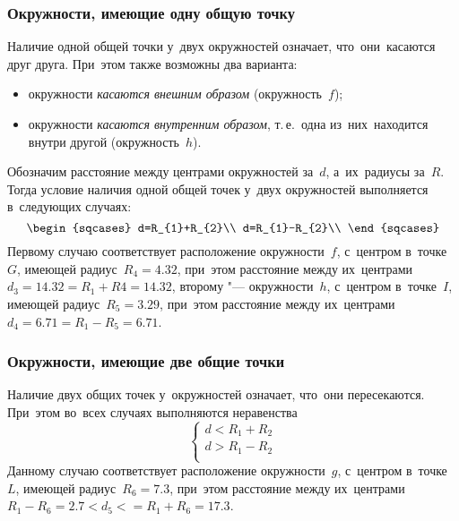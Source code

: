 \documentclass[]{scrartcl}
\begin{document}
\subsubsection{Окружности, имеющие одну общую точку}
Наличие одной общей точки у~двух окружностей означает, что~они~касаются друг друга. При~этом также возможны два варианта:
\begin{itemize}
	\item окружности \emph{касаются внешним образом} (окружность~${\textstyle f}$);
	\item окружности \emph{касаются внутренним образом}, т.\,е.~одна из~них~находится внутри другой (окружность~${\textstyle h}$).
\end{itemize}
Обозначим расстояние между центрами окружностей за~${\textstyle d}$, а~их~радиусы за~${\textstyle R}$. Тогда условие наличия одной общей точек у~двух окружностей выполняется в~следующих случаях:
\begin{equation}\label{eq:two-circles-intersect-one-point}
\begin{sqcases}
d=R_{1}+R_{2}\\
d=R_{1}-R_{2}\\
\end{sqcases}
\end{equation}
Первому случаю соответствует расположение окружности~${\textstyle f}$, с~центром в~точке~${\textstyle G}$, имеющей радиус~${\textstyle R_{4}=4.32}$, при~этом расстояние между их~центрами~${\textstyle d_{3}=14.32=R_{1}+R{4}=14.32}$, второму "--- окружности~${\textstyle h}$, с~центром в~точке~${\textstyle I}$, имеющей радиус~${\textstyle R_{5}=3.29}$, при~этом расстояние между их~центрами~${\textstyle d_{4}=6.71=R_{1}-R_{5}=6.71}$.
\subsubsection{Окружности, имеющие две общие точки}
Наличие двух общих точек у~окружностей означает, что~они пересекаются. При~этом во~всех случаях выполняются неравенства
\begin{equation}\label{eq:two-circles-intersect-two-points}
\begin{cases}
d<R_{1}+R_{2}\\
d>R_{1}-R_{2}\\
\end{cases}
\end{equation}
Данному случаю соответствует расположение окружности~${\textstyle g}$, с~центром в~точке~${\textstyle L}$, имеющей радиус~${\textstyle R_{6}=7.3}$, при~этом расстояние между их~центрами~${\textstyle R_{1}-R_{6}=2.7<d_{5}<=R_{1}+R_{6}=17.3}$.
\end{document}
